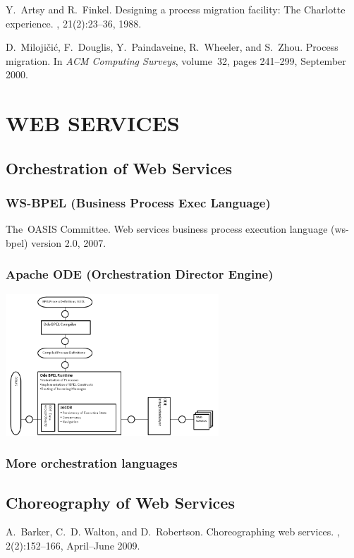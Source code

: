 \documentclass{myproc}
\begin{document}
\w Y.~Artsy and R.~Finkel.
\newblock Designing a process migration facility: The {C}harlotte experience.
, 21(2):23--36, 1988.

\w D.~Miloji\v{c}i\'{c}, F.~Douglis, Y.~Paindaveine, R.~Wheeler, and S.~Zhou.
\newblock Process migration.
\newblock In {\em ACM Computing Surveys}, volume~32, pages 241--299, September
  2000.
\eit

\section{WEB SERVICES}
\subsection{\textcolor{red2}{\bf{}Orchestration of Web Services}}
\subsubsection{WS-BPEL (Business Process Exec Language)}
\bit
\w The~{OASIS} Committee.
\newblock Web services business process execution language (ws-bpel) version
  2.0, 2007.
\eit

\subsubsection{Apache ODE (Orchestration Director Engine)}
\centerline{\includegraphics[width=8cm]{pics/ode-arch}}

\subsubsection{More orchestration languages}
\bit
\w {}
\w {}
\w {}
\eit

\subsection{\textcolor{red2}{\bf{}Choreography of Web Services}}
\bit
\w \textcolor{blue2}{A.~Barker, C.~D. Walton, and D.~Robertson.
\newblock Choreographing web services.
, 2(2):152--166,
  April--June 2009.}
\end{document}
